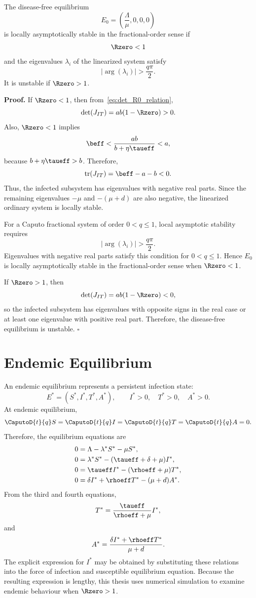 \begin{resultbox}[title={Theorem 4.4 --- Fractional Local Stability of $E_0$}]
The disease-free equilibrium
\[
E_0=\left(\frac{\Lambda}{\mu},0,0,0\right)
\]
is locally asymptotically stable in the fractional-order sense if
\[
\Rzero<1
\]
and the eigenvalues $\lambda_i$ of the linearized system satisfy
\[
|\arg(\lambda_i)|>\frac{q\pi}{2}.
\]
It is unstable if $\Rzero>1$.
\end{resultbox}

\noindent\textbf{Proof.}
If $\Rzero<1$, then from~\eqref{eq:det_R0_relation},
\[
\det(J_{IT})=ab(1-\Rzero)>0.
\]
Also, $\Rzero<1$ implies
\[
\beff < \frac{ab}{b+\eta\taueff}<a,
\]
because $b+\eta\taueff>b$. Therefore,
\[
\operatorname{tr}(J_{IT})=\beff-a-b<0.
\]
Thus, the infected subsystem has eigenvalues with negative real parts. Since the remaining eigenvalues $-\mu$ and $-(\mu+d)$ are also negative, the linearized ordinary system is locally stable.

For a Caputo fractional system of order $0<q\leq1$, local asymptotic stability requires
\[
|\arg(\lambda_i)|>\frac{q\pi}{2}.
\]
Eigenvalues with negative real parts satisfy this condition for $0<q\leq1$. Hence $E_0$ is locally asymptotically stable in the fractional-order sense when $\Rzero<1$.

If $\Rzero>1$, then
\[
\det(J_{IT})=ab(1-\Rzero)<0,
\]
so the infected subsystem has eigenvalues with opposite signs in the real case or at least one eigenvalue with positive real part. Therefore, the disease-free equilibrium is unstable. \hfill$\square$

\section{Endemic Equilibrium}

An endemic equilibrium represents a persistent infection state:
\[
E^*=(S^*,I^*,T^*,A^*),
\qquad
I^*>0,\quad T^*>0,\quad A^*>0.
\]
At endemic equilibrium,
\[
\CaputoD{t}{q}S=
\CaputoD{t}{q}I=
\CaputoD{t}{q}T=
\CaputoD{t}{q}A=0.
\]
Therefore, the equilibrium equations are
\begin{align}
0&=\Lambda-\lambda^*S^*-\mu S^*,\\
0&=\lambda^*S^*-(\taueff+\delta+\mu)I^*,\\
0&=\taueff I^*-(\rhoeff+\mu)T^*,\\
0&=\delta I^*+\rhoeff T^*-(\mu+d)A^*.
\end{align}
From the third and fourth equations,
\[
T^*=\frac{\taueff}{\rhoeff+\mu}I^*,
\]
and
\[
A^*=
\frac{\delta I^*+\rhoeff T^*}{\mu+d}.
\]
The explicit expression for $I^*$ may be obtained by substituting these relations into the force of infection and susceptible equilibrium equation. Because the resulting expression is lengthy, this thesis uses numerical simulation to examine endemic behaviour when $\Rzero>1$.


